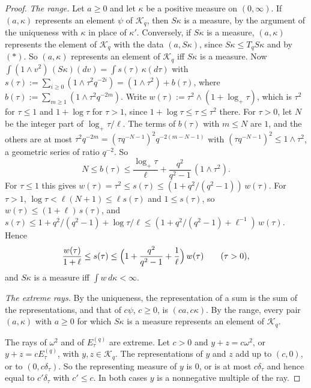 \begin{proof}
\emph{The range.} Let $a \ge 0$ and let $\kappa$ be a positive measure on $(0,\infty)$. If
$(a, \kappa)$ represents an element $\psi$ of $\mathcal{K}_q$, then $S\kappa$ is a \Levy{} measure, by
the argument of the uniqueness with $\kappa$ in place of $\kappa'$. Conversely, if $S\kappa$ is a
\Levy{} measure, $(a, \kappa)$ represents the element of $\mathcal{K}_q$ with the data
$(a, S\kappa)$, since $S\kappa \le T_qS\kappa$ and by $(*)$. So $(a, \kappa)$ represents an element
of $\mathcal{K}_q$ iff $S\kappa$ is a \Levy{} measure. Now
$\int(1 \wedge v^2)\,(S\kappa)(dv) = \int s(\tau)\,\kappa(d\tau)$ with
$s(\tau) := \sum_{i \ge 0}(1 \wedge \tau^2q^{-2i}) = (1 \wedge \tau^2) + b(\tau)$, where
$b(\tau) := \sum_{m \ge 1}(1 \wedge \tau^2q^{-2m})$. Write $w(\tau) := \tau^2 \wedge (1 + \log_+\tau)$,
which is $\tau^2$ for $\tau \le 1$ and $1 + \log\tau$ for $\tau > 1$, since
$1 + \log\tau \le \tau \le \tau^2$ there. For $\tau > 0$, let $N$ be the integer part of
$\log_+\tau/\ell$. The terms of $b(\tau)$ with $m \le N$ are $1$, and the others are at most
$\tau^2q^{-2m} = (\tau q^{-N-1})^2q^{-2(m - N - 1)}$ with $(\tau q^{-N-1})^2 \le 1 \wedge \tau^2$, a
geometric series of ratio $q^{-2}$. So
\[
  N \le b(\tau) \le \frac{\log_+\tau}{\ell} + \frac{q^2}{q^2 - 1}\,(1 \wedge \tau^2) .
\]
For $\tau \le 1$ this gives $w(\tau) = \tau^2 \le s(\tau) \le (1 + q^2/(q^2 - 1))\,w(\tau)$. For
$\tau > 1$, $\log\tau < \ell(N + 1) \le \ell s(\tau)$ and $1 \le s(\tau)$, so
$w(\tau) \le (1 + \ell)\,s(\tau)$, and $s(\tau) \le 1 + q^2/(q^2 - 1) + \log\tau/\ell
\le (1 + q^2/(q^2 - 1) + \ell^{-1})\,w(\tau)$. Hence
\[
  \frac{w(\tau)}{1 + \ell} \le s(\tau) \le \Bigl(1 + \frac{q^2}{q^2 - 1} + \frac1\ell\Bigr)\,w(\tau)
  \qquad (\tau > 0),
\]
and $S\kappa$ is a \Levy{} measure iff $\int w\,d\kappa < \infty$.

\emph{The extreme rays.} By the uniqueness, the representation of a sum is the sum of the
representations, and that of $c\psi$, $c \ge 0$, is $(ca, c\kappa)$. By the range, every pair
$(a,\kappa)$ with $a \ge 0$ for which $S\kappa$ is a \Levy{} measure represents an element of
$\mathcal{K}_q$.

The rays of $\omega^2$ and of $E^{(q)}_\tau$ are extreme. Let $c > 0$ and $y + z = c\omega^2$, or
$y + z = cE^{(q)}_\tau$, with $y, z \in \mathcal{K}_q$. The representations of $y$ and $z$ add up to
$(c, 0)$, or to $(0, c\delta_\tau)$. So the representing measure of $y$ is $0$, or is at most
$c\delta_\tau$ and hence equal to $c'\delta_\tau$ with $c' \le c$. In both cases $y$ is a nonnegative
multiple of the ray.


\end{proof}
